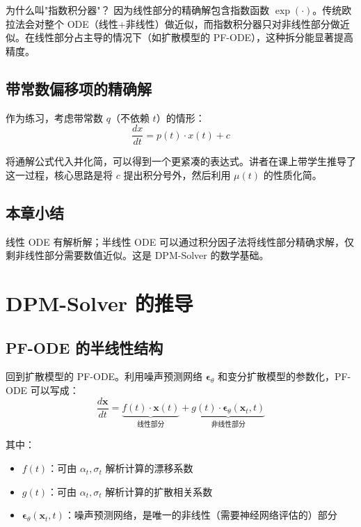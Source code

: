 \documentclass[a4paper]{article}
\begin{document}
\begin{knowledgebox}{为什么叫"指数积分器"？}
因为线性部分的精确解包含指数函数 $\exp(\cdot)$。传统欧拉法会对整个 ODE（线性+非线性）做近似，而指数积分器只对非线性部分做近似。在线性部分占主导的情况下（如扩散模型的 PF-ODE），这种拆分能显著提高精度。
\end{knowledgebox}

\subsection{带常数偏移项的精确解}

作为练习，考虑带常数 $q$（不依赖 $t$）的情形：
$$\frac{dx}{dt} = p(t) \cdot x(t) + c$$

将通解公式代入并化简，可以得到一个更紧凑的表达式。讲者在课上带学生推导了这一过程，核心思路是将 $c$ 提出积分号外，然后利用 $\mu(t)$ 的性质化简。

\subsection{本章小结}

线性 ODE 有解析解；半线性 ODE 可以通过积分因子法将线性部分精确求解，仅剩非线性部分需要数值近似。这是 DPM-Solver 的数学基础。


\section{DPM-Solver 的推导}

\subsection{PF-ODE 的半线性结构}

回到扩散模型的 PF-ODE。利用噪声预测网络 $\boldsymbol{\epsilon}_\theta$ 和变分扩散模型的参数化，PF-ODE 可以写成：
$$\frac{d\mathbf{x}}{dt} = \underbrace{f(t) \cdot \mathbf{x}(t)}_{\text{线性部分}} + \underbrace{g(t) \cdot \boldsymbol{\epsilon}_\theta(\mathbf{x}_t, t)}_{\text{非线性部分}}$$

其中：
\begin{itemize}
    \item $f(t)$：可由 $\alpha_t, \sigma_t$ 解析计算的漂移系数
    \item $g(t)$：可由 $\alpha_t, \sigma_t$ 解析计算的扩散相关系数
    \item $\boldsymbol{\epsilon}_\theta(\mathbf{x}_t, t)$：噪声预测网络，是唯一的非线性（需要神经网络评估的）部分
\end{itemize}
\end{document}
